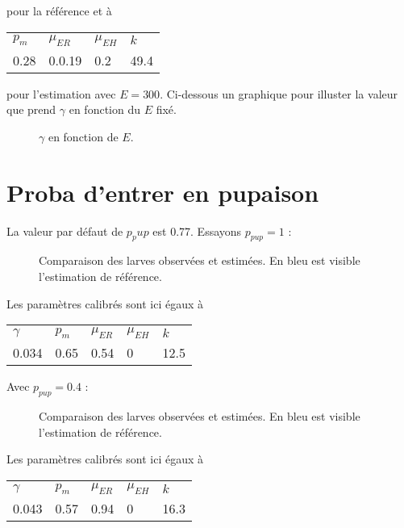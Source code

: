\documentclass[a4paper, 11pt]{article}
\begin{document}
pour la référence et à 

\begin{center}
\begin{tabular}{llll}
 $p_m$ & $\mu_{ER}$ & $\mu_{EH}$ & $k$\\
0.28 & 0.0.19 & 0.2 & 49.4
\end{tabular}
\end{center}

pour l'estimation avec $E = 300$.
Ci-dessous un graphique pour illuster la valeur que prend $\gamma$ en fonction du $E$ fixé.

\begin{figure}[h]
 \centering
 \caption{$\gamma$ en fonction de $E$.}
\end{figure}

\newpage
\section{Proba d'entrer en pupaison}

La valeur par défaut de $p_pup$ est 0.77. Essayons $p_{pup} = 1$ :

\begin{figure}[h]
 \centering
 \caption{Comparaison des larves observées et estimées. En bleu est visible l'estimation de référence.}
\end{figure}

Les paramètres calibrés sont ici égaux à 

\begin{center}
\begin{tabular}{lllll}
$\gamma$ & $p_m$ & $\mu_{ER}$ & $\mu_{EH}$ & $k$\\
0.034 & 0.65 & 0.54 & 0 & 12.5
\end{tabular}
\end{center}


Avec $p_{pup} = 0.4$ : 


\begin{figure}[h]
 \centering
 \caption{Comparaison des larves observées et estimées. En bleu est visible l'estimation de référence.}
\end{figure}

Les paramètres calibrés sont ici égaux à 

\begin{center}
\begin{tabular}{lllll}
$\gamma$ & $p_m$ & $\mu_{ER}$ & $\mu_{EH}$ & $k$\\
0.043 & 0.57 & 0.94 & 0 & 16.3
\end{tabular}
\end{center}
\end{document}
